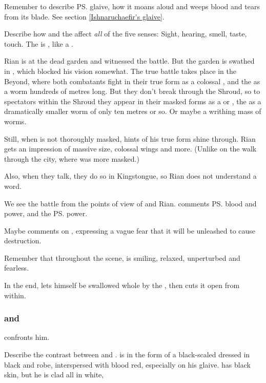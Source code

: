 Remember to describe \ps{\Ishnaruchaefir} glaive, how it moans aloud and weeps blood and tears from its blade. See section \ref{Ishnaruchaefir's glaive}. 

Describe how \Ishnaruchaefir{} and the \noggyal{} affect \emph{all} of the five senses: Sight, hearing, smell, taste, touch. The \noggyal{} is , like a \bane. 

Rian is at the dead garden and witnessed the battle. But the garden is swathed in \wildfog, which blocked his vision somewhat. The true battle takes place in the Beyond, where both combatants fight in their true form\dash\Ishnaruchaefir{} as a colossal \dragon, and the \noggyal{} as a worm hundreds of metres long. But they don't break through the Shroud, so to spectators within the Shroud they appear in their masked forms\dash\Ishnaruchaefir{} as a \scatha{} or \rachyth, the \noggyal{} as a dramatically smaller worm of only ten metres or so. Or maybe a writhing mass of worms. 

Still, when \Ishnaruchaefir{} is not thoroughly masked, hints of his true form shine through. Rian gets an impression of massive size, colossal wings and more. (Unlike on the walk through the city, where \Ishnaruchaefir{} was more masked.)

Also, when they talk, they do so in \Draconic{} Kingstongue, so Rian does not understand a word.

We see the battle from the points of view of \Criseis{} and Rian. \Criseis{} comments \ps{\Ishnaruchaefir} \xzaishannic{} blood and power, and the \ps{\noggyal} \Erebean{}  power. 

Maybe \Criseis{} comments on , expressing a vague fear that it will be unleashed to cause destruction.

Remember that throughout the scene, \Ishnaruchaefir{} is smiling, relaxed, unperturbed and fearless.

In the end, \Ishnaruchaefir{} lets himself be swallowed whole by the \noggyal, then cuts it open from within. 





\subsubsection[Ishnaruchaefir and Teshrial]{\Ishnaruchaefir{} and \Teshrial}
\Teshrial{} confronts him. 

Describe the contrast between \Ishnaruchaefir{} and \Teshrial. \Ishnaruchaefir{} is in the form of a black-scaled \scatha{} dressed in black \armour and robe, interspersed with blood red, especially on his glaive. 
\Teshrial{} has black skin, but he is clad all in white, 

